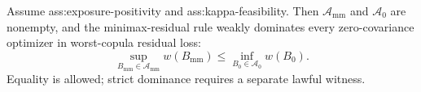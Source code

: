 Assume ass:exposure-positivity and ass:kappa-feasibility. Then \(\mathcal A_{\mathrm{mm}}\) and \(\mathcal A_0\) are nonempty, and the minimax-residual rule weakly dominates every zero-covariance optimizer in worst-copula residual loss:
\[
\sup_{B_{\mathrm{mm}}\in\mathcal A_{\mathrm{mm}}}w(B_{\mathrm{mm}})
\le
\inf_{B_0\in\mathcal A_0}w(B_0).
\]
Equality is allowed; strict dominance requires a separate lawful witness.